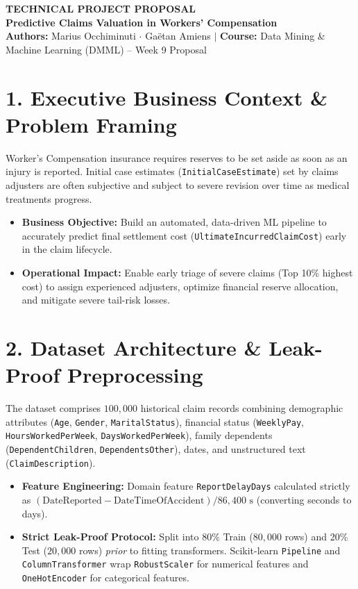 \documentclass[10pt,a4paper]{article}
\begin{document}
\begin{center}
    {\fontsize{13}{16}\selectfont \bfseries \color{brandNavy} TECHNICAL PROJECT PROPOSAL}\\[2pt]
    {\normalsize \bfseries \color{brandAccent} Predictive Claims Valuation in Workers' Compensation}\\[3pt]
    {\footnotesize \textbf{Authors:} Marius Occhiminuti $\cdot$ Gaëtan Amiens \quad $\vert$ \quad \textbf{Course:} Data Mining \& Machine Learning (DMML) -- Week 9 Proposal}
\end{center}
\vspace{-4pt}

\section{1. Executive Business Context \& Problem Framing}
Worker's Compensation insurance requires reserves to be set aside as soon as an injury is reported. Initial case estimates (\texttt{InitialCaseEstimate}) set by claims adjusters are often subjective and subject to severe revision over time as medical treatments progress.
\begin{itemize}
    \item \textbf{Business Objective:} Build an automated, data-driven ML pipeline to accurately predict final settlement cost (\texttt{UltimateIncurred\allowbreak{}ClaimCost}) early in the claim lifecycle.
    \item \textbf{Operational Impact:} Enable early triage of severe claims (Top 10\% highest cost) to assign experienced adjusters, optimize financial reserve allocation, and mitigate severe tail-risk losses.
\end{itemize}

\section{2. Dataset Architecture \& Leak-Proof Preprocessing}
The dataset comprises $100{,}000$ historical claim records combining demographic attributes (\texttt{Age}, \texttt{Gender}, \texttt{MaritalStatus}), financial status (\texttt{WeeklyPay}, \texttt{HoursWorkedPerWeek}, \texttt{DaysWorkedPerWeek}), family dependents (\texttt{DependentChildren}, \texttt{DependentsOther}), dates, and unstructured text (\texttt{ClaimDescription}).
\begin{itemize}
    \item \textbf{Feature Engineering:} Domain feature \texttt{ReportDelayDays} calculated strictly as $(\text{DateReported} - \text{DateTimeOfAccident}) / 86{,}400\text{ s}$ (converting seconds to days).
    \item \textbf{Strict Leak-Proof Protocol:} Split into 80\% Train ($80{,}000$ rows) and 20\% Test ($20{,}000$ rows) \emph{prior} to fitting transformers. Scikit-learn \texttt{Pipeline} and \texttt{ColumnTransformer} wrap \texttt{RobustScaler} for numerical features and \texttt{OneHotEncoder} for categorical features.
\end{itemize}
\end{document}
